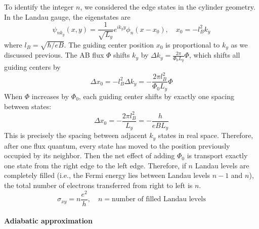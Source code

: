 \documentclass[12pt,a4paper]{article}
\begin{document}
    To identify the integer $n$, we considered the edge states in the cylinder geometry. In the Landau gauge, the eigenstates are
    \[
        \psi_{nk_y}(x,y)
        = \frac{1}{\sqrt{L_y}} e^{ik_y y} \phi_n(x - x_0), \quad
        x_0 = -l_B^2 k_y
    \]
    where $l_B = \sqrt{\hbar/eB}$. The guiding center position $x_0$ is proportional to $k_y$ as we discussed previous. The AB flux $\Phi$ shifts $k_y$ by $\Delta k_y = \frac{2\pi}{\Phi_0 L_y} \Phi$, which shifts all guiding centers by
    \[
        \Delta x_0
        = -l_B^2 \Delta k_y
        = -\frac{2\pi l_B^2}{\Phi_0 L_y} \Phi
    \]
    When $\Phi$ increases by $\Phi_0$, each guiding center shifts by exactly one spacing between states:
    \[
        \Delta x_0
        = -\frac{2\pi l_B^2}{L_y}
        = -\frac{h}{eB L_y}
    \]
    This is precisely the spacing between adjacent $k_y$ states in real space. Therefore, after one flux quantum, every state has moved to the position previously occupied by its neighbor. Then the net effect of adding $\Phi_0$ is transport exactly one state from the right edge to the left edge. Therefore, if $n$ Landau levels are completely filled (i.e., the Fermi energy lies between Landau levels $n-1$ and $n$), the total number of electrons transferred from right to left is $n$.
    \begin{equation}
        \sigma_{xy} = n \frac{e^2}{h}, \quad n = \text{number of filled Landau levels}
    \end{equation}

\paragraph{Adiabatic approximation}
\end{document}
